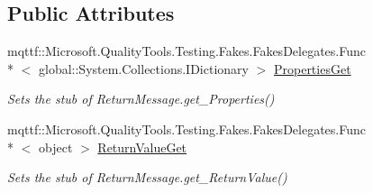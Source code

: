 \subsection*{Public Attributes}
\begin{DoxyCompactItemize}
\item 
mqttf\-::\-Microsoft.\-Quality\-Tools.\-Testing.\-Fakes.\-Fakes\-Delegates.\-Func\\*
$<$ global\-::\-System.\-Collections.\-I\-Dictionary $>$ \hyperlink{class_system_1_1_runtime_1_1_remoting_1_1_messaging_1_1_fakes_1_1_stub_return_message_ab2794da68a260dccdbf01695008fe7fd}{Properties\-Get}
\begin{DoxyCompactList}\small\item\em Sets the stub of Return\-Message.\-get\-\_\-\-Properties()\end{DoxyCompactList}\item 
mqttf\-::\-Microsoft.\-Quality\-Tools.\-Testing.\-Fakes.\-Fakes\-Delegates.\-Func\\*
$<$ object $>$ \hyperlink{class_system_1_1_runtime_1_1_remoting_1_1_messaging_1_1_fakes_1_1_stub_return_message_af5c6ee89cdca6dadf4becf2a0f2c725b}{Return\-Value\-Get}
\begin{DoxyCompactList}\small\item\em Sets the stub of Return\-Message.\-get\-\_\-\-Return\-Value()\end{DoxyCompactList}\end{DoxyCompactItemize}
